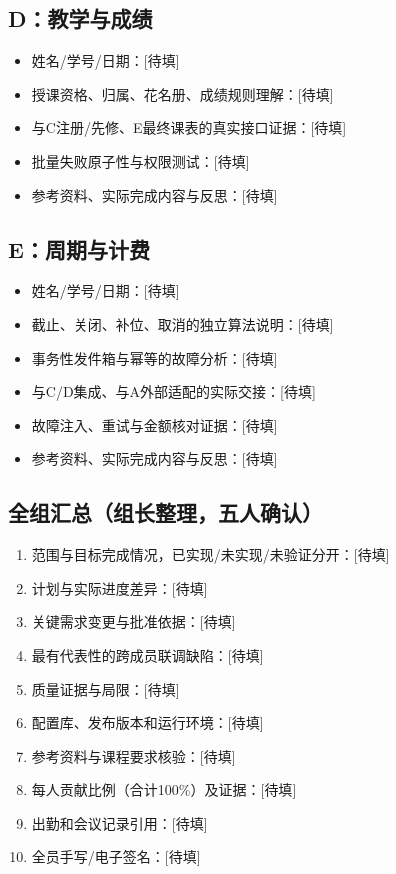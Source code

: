 \documentclass[UTF8,11pt,a4paper]{ctexart}
\providecommand{\tightlist}{\setlength{\itemsep}{0pt}\setlength{\parskip}{0pt}}
\begin{document}
\hypertarget{dux6559ux5b66ux4e0eux6210ux7ee9}{%
\subsection{D：教学与成绩}\label{dux6559ux5b66ux4e0eux6210ux7ee9}}

\begin{itemize}
\tightlist
\item
  姓名/学号/日期：{[}待填{]}
\item
  授课资格、归属、花名册、成绩规则理解：{[}待填{]}
\item
  与C注册/先修、E最终课表的真实接口证据：{[}待填{]}
\item
  批量失败原子性与权限测试：{[}待填{]}
\item
  参考资料、实际完成内容与反思：{[}待填{]}
\end{itemize}

\hypertarget{eux5468ux671fux4e0eux8ba1ux8d39}{%
\subsection{E：周期与计费}\label{eux5468ux671fux4e0eux8ba1ux8d39}}

\begin{itemize}
\tightlist
\item
  姓名/学号/日期：{[}待填{]}
\item
  截止、关闭、补位、取消的独立算法说明：{[}待填{]}
\item
  事务性发件箱与幂等的故障分析：{[}待填{]}
\item
  与C/D集成、与A外部适配的实际交接：{[}待填{]}
\item
  故障注入、重试与金额核对证据：{[}待填{]}
\item
  参考资料、实际完成内容与反思：{[}待填{]}
\end{itemize}

\hypertarget{ux5168ux7ec4ux6c47ux603bux7ec4ux957fux6574ux7406ux4e94ux4ebaux786eux8ba4}{%
\subsection{全组汇总（组长整理，五人确认）}\label{ux5168ux7ec4ux6c47ux603bux7ec4ux957fux6574ux7406ux4e94ux4ebaux786eux8ba4}}

\begin{enumerate}
\def\labelenumi{\arabic{enumi}.}
\tightlist
\item
  范围与目标完成情况，已实现/未实现/未验证分开：{[}待填{]}
\item
  计划与实际进度差异：{[}待填{]}
\item
  关键需求变更与批准依据：{[}待填{]}
\item
  最有代表性的跨成员联调缺陷：{[}待填{]}
\item
  质量证据与局限：{[}待填{]}
\item
  配置库、发布版本和运行环境：{[}待填{]}
\item
  参考资料与课程要求核验：{[}待填{]}
\item
  每人贡献比例（合计100\%）及证据：{[}待填{]}
\item
  出勤和会议记录引用：{[}待填{]}
\item
  全员手写/电子签名：{[}待填{]}
\end{enumerate}
\end{document}
